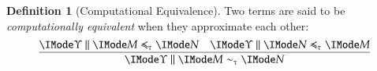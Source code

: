 \documentclass[11pt]{article}
\theoremstyle{definition}
\newtheorem{definition}[thm]{Definition}
\theoremstyle{remark}
\numberwithin{equation}{section}
\newcommand\Pow[1]{\wp\left(#1\right)}
\newcommand\Exprs{\mathbf{E}}
\begin{document}
\begin{definition}[Computational Equivalence]
  Two terms are said to be \emph{computationally equivalent} when they approximate each other:
  \[
    \infer{
      \SBinRel{\sim_\tau}{\Upsilon}{M}{N}
    }{
      \SBinRel{\preccurlyeq_\tau}{\Upsilon}{M}{N} &
      \SBinRel{\preccurlyeq_\tau}{\Upsilon}{N}{M}
    }
  \]
\end{definition}


\ifdraft{}{
  \newpage
  \nocite{maclane:1971}
  
  
}
\end{document}
